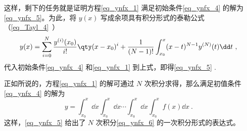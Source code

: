 这样，剩下的任务就是证明方程\autoref{eq_ynfx_1} 满足初始条件\autoref{eq_ynfx_4} 的解为\autoref{eq_ynfx_5}。为此，将 $y(x)$ 写成余项具有积分形式的泰勒公式（\autoref{eq_Tayl_4}~）
\begin{equation}
y(x)=\sum_{i=0}^{N}\frac{y^{(i)}(x_0)}{i!}\qty(x-x_0)^{i}+\frac{1}{(N-1)!}\int_{x_0}^{x}(x-t)^{N-1}y^{(N)}(t)\dd t~,
\end{equation}
代入初始条件\autoref{eq_ynfx_4} 和\autoref{eq_ynfx_1} 到上式，即得\autoref{eq_ynfx_5} .

正如所说的，方程\autoref{eq_ynfx_1} 的解可通过 $N$ 次积分求得，那么满足初值条件\autoref{eq_ynfx_4} 的解为
\begin{equation}\label{eq_ynfx_6}
y=\int_{x_0}^x\dd x\int_{x_0}^x\dd x\cdots\int_{x_0}^{x}\dd x\int_{x_0}^{x}f(x)\dd x~.
\end{equation}
这样，\autoref{eq_ynfx_5} 给出了 $N$ 次积分\autoref{eq_ynfx_6} 的一次积分形式的表达式。
